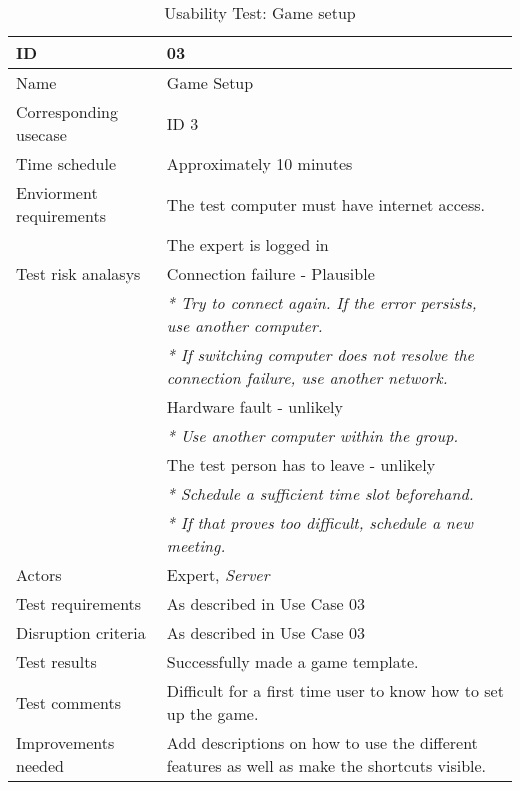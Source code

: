 {\footnotesize
\begin{table}[H]
\begin{tabular}{| p{5cm} | p{10cm} |}\hline
	\textbf{ID}	& \textbf{03} \\ \hline
	Name		& Game Setup\\ \hline
	Corresponding usecase & ID 3\\ \hline
	Time schedule	& Approximately 10 minutes\\ \hline
	Enviorment requirements 
		& The test computer must have internet access. \\
		& The expert is logged in\\ \hline
	Test risk analasys 
		& Connection failure - Plausible \\
		& \emph{* Try to connect again. If the error persists, use another computer.} \\
		& \emph{* If switching computer does not resolve the connection failure, use another network.}\\
		& Hardware fault - unlikely \\
		& \emph{* Use another computer within the group.} \\
		& The test person has to leave - unlikely \\
		& \emph{* Schedule a sufficient time slot beforehand.} \\
		& \emph{* If that proves too difficult, schedule a new meeting.}\\ \hline
	Actors	& Expert, \emph{Server}\\ \hline
	Test requirements & As described in Use Case 03 \\ \hline
	Disruption criteria & As described in Use Case 03  \\ \hline
	Test results & Successfully made a game template.
		\\ \hline
	Test comments & Difficult for a first time user to know how to set up the game.
		\\ \hline
	Improvements needed & Add descriptions on how to use the different features as well as make the shortcuts visible. 
		\\ \hline
\end{tabular}


\caption{Usability Test: Game setup}
\label{fig:usability_test_3}
\end{table}}



